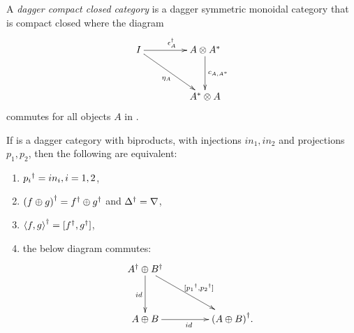 \begin{definition}\label{def:daggercompact}
  A \emph{dagger compact closed category} \cD{} is a dagger symmetric monoidal category
  that is compact closed where the diagram
  \[
    \xymatrix @C+20pt @R+10pt{
      I \ar[r]^{\epsilon^{\dagger}_{A}} \ar[dr]_{\eta_{A}} &A\*A^{*}\ar[d]^{c_{A,A^{*}}}\\
      &A^{*}\* A
    }
  \]
  commutes for all  objects $A$ in \cD.
\end{definition}

\begin{lemma}\label{lemma:daggerbiproducts}
If \cD{} is a dagger category with biproducts, with injections $in_{1},in_{2}$ and projections
$p_{1},p_{2}$, then the following are equivalent:
\begin{enumerate}
  \item ${p_{i}}^{\dagger} = in_{i}, i=1,2$, \label{ldpdgrpisq}
  \item ${(f\oplus g)}^{\dagger} = {f}^{\dagger}\oplus{g}^{\dagger}$ and ${\Delta}^{\dagger} = \nabla$,\label{ldpddeltisnab}
  \item ${\langle f,g\rangle}^{\dagger} = [{f}^{\dagger},{g}^{\dagger}]$,\label{ldpdcopisprod}
  \item the below diagram commutes:\label{ldpcommute}
  \[
    \xymatrix @C+20pt @R+10pt{
      \dgr{A} \+ \dgr{B} \ar[d]_{id} \ar[dr]^{[\dgr{p_{1}},\dgr{p_{2}}]}\\
      A\+B\ar[r]_{id}&\dgr{(A\+B)}.
    }
  \]
\end{enumerate}
\end{lemma}

